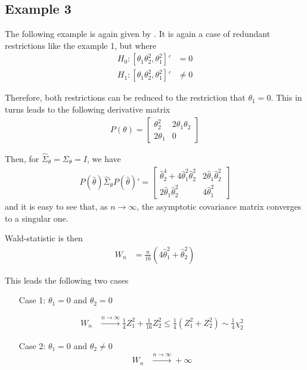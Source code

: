 \documentclass[]{article}\usepackage[]{graphicx}\usepackage[]{color}
\begin{document}
\subsection{Example 3}

The following example is again given by \cite{dufour_wald_2013}. It is again a case of redundant restrictions like the example 1, but where
\begin{align}
	H_0: [\theta_1 \theta_2^2 , \theta_1^2]' & = 0 \\
	H_1: [\theta_1 \theta_2^2 , \theta_1^2]'  & \neq 0
\end{align}

Therefore, both restrictions can be reduced to the restriction that $\theta_1=0$. This in turns leads to the following derivative matrix
\begin{align}
	P(\theta) = \left[\begin{array}{cc}
		\theta_2^2 & 2\theta_1 \theta_2 \\
		2\theta_1 & 0
	\end{array}\right]
\end{align}

Then, for $\hat{\Sigma}_\theta=\Sigma_\theta=I$, we have
\begin{align}
	P(\hat{\theta})\hat{\Sigma}_\theta P(\hat{\theta})' = \left[\begin{array}{cc}
		\hat{\theta}_2^4 + 4 \hat{\theta}_1^2\hat{\theta}_2^2 &  2 \hat{\theta}_1\hat{\theta}_2^2 \\
		2 \hat{\theta}_1\hat{\theta}_2^2&  4 \hat{\theta}_1^2
	\end{array}\right]
\end{align}
and it is easy to see that, as $n\rightarrow\infty$, the asymptotic covariance matrix converges to a singular one.

Wald-statistic is then
\begin{align}
	W_n & = \frac{n}{16}(4 \hat{\theta}_1^2 + \hat{\theta}_2^2)
\end{align}

This leads the following two cases \begin{itemize}
	\item[Case 1:] $\theta_1=0$ and $ \theta_2 = 0$

	\begin{align}
		W_n & \xrightarrow{n \rightarrow \infty} \frac{1}{4} Z_1^2 + \frac{1}{16} Z_2^2 \leq \frac{1}{4}( Z_1^2 + Z_2^2) \sim \frac{1}{4} \chi^2_2
	\end{align}

	\item[Case 2:] $\theta_1=0$ and $ \theta_2 \neq 0$
	\begin{align}
		W_n & \xrightarrow{n \rightarrow \infty} + \infty
	\end{align}
\end{itemize}
\end{document}
